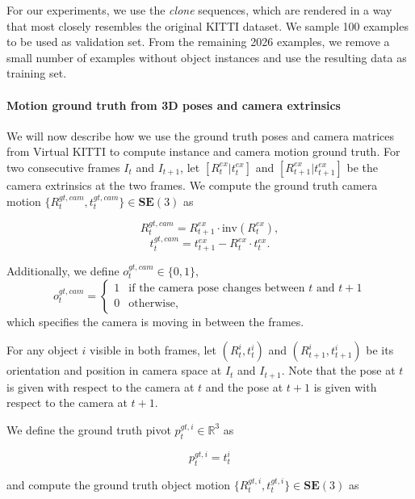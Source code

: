 For our experiments, we use the \emph{clone} sequences, which are rendered in a
way that most closely resembles the original KITTI dataset. We sample 100 examples
to be used as validation set. From the remaining 2026 examples,
we remove a small number of examples without object instances and use the resulting
data as training set.

\paragraph{Motion ground truth from 3D poses and camera extrinsics}
We will now describe how we use the ground truth poses and camera matrices from Virtual KITTI to
compute instance and camera motion ground truth.
For two consecutive frames $I_t$ and $I_{t+1}$,
let $[R_t^{ex}|t_t^{ex}]$
and $[R_{t+1}^{ex}|t_{t+1}^{ex}]$
be the camera extrinsics at the two frames.
We compute the ground truth camera motion
$\{R_t^{gt, cam}, t_t^{gt, cam}\} \in \mathbf{SE}(3)$ as

\begin{equation}
R_{t}^{gt, cam} = R_{t+1}^{ex}  \cdot \mathrm{inv}(R_t^{ex}),
\end{equation}
\begin{equation}
t_{t}^{gt, cam} = t_{t+1}^{ex}  - R_{t}^{ex} \cdot t_t^{ex}.
\end{equation}

Additionally, we define $o_t^{gt, cam} \in \{ 0, 1 \}$,
\begin{equation}
o_t^{gt, cam} =
\begin{cases}
1 &\text{if the camera pose changes between $t$ and $t+1$} \\
0 &\text{otherwise,}
\end{cases}
\end{equation}
which specifies the camera is moving in between the frames.

For any object $i$ visible in both frames, let
$(R_t^i, t_t^i)$ and $(R_{t+1}^i, t_{t+1}^i)$
be its orientation and position in camera space
at $I_t$ and $I_{t+1}$.
Note that the pose at $t$ is given with respect to the camera at $t$ and
the pose at $t+1$ is given with respect to the camera at $t+1$.

We define the ground truth pivot $p_{t}^{gt, i} \in \mathbb{R}^3$ as

\begin{equation}
p_{t}^{gt, i} = t_t^i
\end{equation}

and compute the ground truth object motion
$\{R_t^{gt, i}, t_t^{gt, i}\} \in \mathbf{SE}(3)$ as

